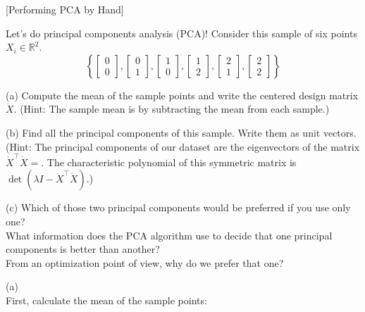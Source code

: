 \item {} [Performing PCA by Hand]

Let's do principal components analysis (PCA)! Consider this sample of six points $X_i \in \mathbb{R}^2$.
$$\left\{
\left[\begin{array}{l} 0 \\ 0 \end{array}\right],
\left[\begin{array}{l} 0 \\ 1 \end{array}\right],
\left[\begin{array}{l} 1 \\ 0 \end{array}\right],
\left[\begin{array}{l} 1 \\ 2 \end{array}\right],
\left[\begin{array}{l} 2 \\ 1 \end{array}\right],
\left[\begin{array}{l} 2 \\ 2 \end{array}\right]\right\}$$

(a) Compute the mean of the sample points and write the centered design matrix $\dot{X}$. 
(Hint: The sample mean is by subtracting the mean from each sample.)

(b) Find all the principal components of this sample. Write them as unit vectors. 
(Hint: The principal components of our dataset are the eigenvectors of the matrix $\dot{X}^{\top} \dot{X}=
$. The characteristic polynomial of this symmetric matrix is $\det\left(\lambda I-\dot{X}^{\top} \dot{X}\right)$.)

(c) Which of those two principal components would be preferred if you use only one?  \\
What information does the PCA algorithm use to decide that one principal components is better than another?  \\
From an optimization point of view, why do we prefer that one? 

\solution

(a)\\
First, calculate the mean of the sample points:

